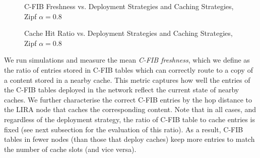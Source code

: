 \documentclass{sig-alternate}
\begin{document}
\begin{figure}[!t]
\centering
{} 
    	\caption{C-FIB Freshness vs. Deployment Strategies and Caching Strategies, Zipf $\alpha=0.8$}
    	\label{C-FIB-freshness}
\end{figure}


\begin{figure}[!t]
\centering
{} 
    	\caption{Cache Hit Ratio vs. Deployment Strategies and Caching Strategies, Zipf $\alpha=0.8$}
    	\label{deployment-strategies}
\end{figure}



We run simulations and measure the mean \textit{C-FIB freshness}, which we define as the ratio of entries stored in C-FIB tables which can correctly route to a copy of a content stored in a nearby cache.
This metric captures how well the entries of the C-FIB tables deployed in the network reflect the current state of nearby caches.
We further characterise the correct C-FIB entries by the hop distance to the LIRA node that caches the corresponding content.
Note that in all cases, and regardless of the deployment strategy, the ratio of C-FIB table to cache entries is fixed (see next subsection for the evaluation of this ratio).
As a result, C-FIB tables in fewer nodes (than those that deploy caches) keep more entries to match the number of cache slots (and vice versa).
\end{document}
